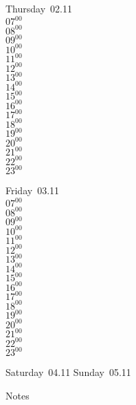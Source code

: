\documentclass[11pt, a4paper]{book}\usepackage[]{graphicx}\usepackage[]{color}
\begin{document}
\begin{weekdaybox}
  Thursday~02.11\\
  { 
  \vfill
  $07^{00}$\\
$08^{00}$\\
$09^{00}$\\
$10^{00}$\\
$11^{00}$\\
$12^{00}$\\
$13^{00}$\\
$14^{00}$\\
$15^{00}$\\
$16^{00}$\\
$17^{00}$\\
$18^{00}$\\
$19^{00}$\\
$20^{00}$\\
$21^{00}$\\
$22^{00}$\\
$23^{00}$\\
  }
\end{weekdaybox} 
\begin{weekdaybox}
  Friday~03.11\\
  { 
  \vfill
  $07^{00}$\\
$08^{00}$\\
$09^{00}$\\
$10^{00}$\\
$11^{00}$\\
$12^{00}$\\
$13^{00}$\\
$14^{00}$\\
$15^{00}$\\
$16^{00}$\\
$17^{00}$\\
$18^{00}$\\
$19^{00}$\\
$20^{00}$\\
$21^{00}$\\
$22^{00}$\\
$23^{00}$\\
  }
\end{weekdaybox}
\begin{weekendbox}
  Saturday~04.11
  \tcblower
  Sunday~05.11
\end{weekendbox} %
\begin{notebox}
  Notes
\end{notebox}
\clearpage
\end{document}

